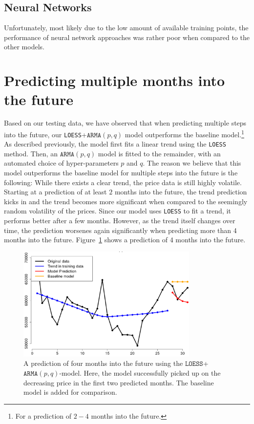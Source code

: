 \documentclass[11pt,a4paper]{article}
\begin{document}
	\subsection*{Neural Networks}
	Unfortunately, most likely due to the low amount of available training points, the performance of neural network approaches was rather poor when compared to the other models.

	\section*{Predicting multiple months into the future}
	Based on our testing data, we have observed that when predicting multiple steps into the future, our \texttt{LOESS}+$\mathtt{ARMA}(p,q)$ model outperforms the baseline model.\footnote{For a prediction of $2-4$ months into the future.} As described previously, the model first fits a linear trend using the \texttt{LOESS} method. Then, an $\mathtt{ARMA}(p,q)$ model is fitted to the remainder, with an automated choice of hyper-parameters $p$ and $q$. The reason we believe that this model outperforms the baseline model for multiple steps into the future is the following: While there exists a clear trend, the price data is still highly volatile. Starting at a prediction of at least $2$ months into the future, the trend prediction kicks in and the trend becomes more significant when compared to the seemingly random volatility of the prices. Since our model uses \texttt{LOESS} to fit a trend, it performs better after a few months. However, as the trend itself changes over time, the prediction worsenes again significantly when predicting more than 4 months into the future. Figure~\ref{fig:image1} shows a prediction of 4 months into the future.
	
	\begin{figure}[h!]
		\centering
		\includegraphics[width=0.8\textwidth]{image1.png}
		\caption{A prediction of four months into the future using the $\mathtt{LOESS}$+$\mathtt{ARMA}(p,q)$-model. Here, the model successfully picked up on the decreasing price in the first two predicted months. The baseline model is added for comparison.}
		\label{fig:image1}
	\end{figure}
	
\end{document}

